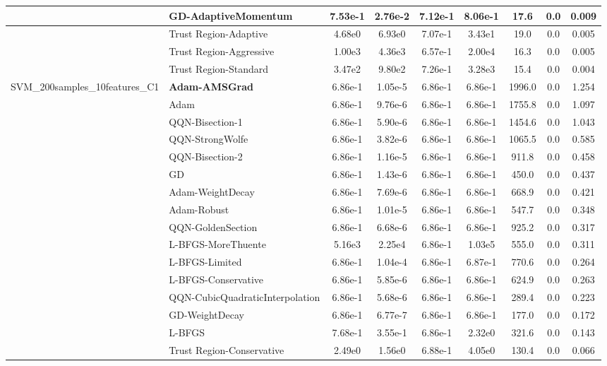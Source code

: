 \documentclass{article}
\begin{document}
\begin{longtable}{|l|l|c|c|c|c|c|c|c|}
\hline
 & GD-AdaptiveMomentum & 7.53e-1 & 2.76e-2 & 7.12e-1 & 8.06e-1 & 17.6 & 0.0 & 0.009 \\
\hline
 & Trust Region-Adaptive & 4.68e0 & 6.93e0 & 7.07e-1 & 3.43e1 & 19.0 & 0.0 & 0.005 \\
\hline
 & Trust Region-Aggressive & 1.00e3 & 4.36e3 & 6.57e-1 & 2.00e4 & 16.3 & 0.0 & 0.005 \\
\hline
 & Trust Region-Standard & 3.47e2 & 9.80e2 & 7.26e-1 & 3.28e3 & 15.4 & 0.0 & 0.004 \\
SVM\_200samples\_10features\_C1 & \textbf{Adam-AMSGrad} & 6.86e-1 & 1.05e-5 & 6.86e-1 & 6.86e-1 & 1996.0 & 0.0 & 1.254 \\
\hline
 & Adam & 6.86e-1 & 9.76e-6 & 6.86e-1 & 6.86e-1 & 1755.8 & 0.0 & 1.097 \\
\hline
 & QQN-Bisection-1 & 6.86e-1 & 5.90e-6 & 6.86e-1 & 6.86e-1 & 1454.6 & 0.0 & 1.043 \\
\hline
 & QQN-StrongWolfe & 6.86e-1 & 3.82e-6 & 6.86e-1 & 6.86e-1 & 1065.5 & 0.0 & 0.585 \\
\hline
 & QQN-Bisection-2 & 6.86e-1 & 1.16e-5 & 6.86e-1 & 6.86e-1 & 911.8 & 0.0 & 0.458 \\
\hline
 & GD & 6.86e-1 & 1.43e-6 & 6.86e-1 & 6.86e-1 & 450.0 & 0.0 & 0.437 \\
\hline
 & Adam-WeightDecay & 6.86e-1 & 7.69e-6 & 6.86e-1 & 6.86e-1 & 668.9 & 0.0 & 0.421 \\
\hline
 & Adam-Robust & 6.86e-1 & 1.01e-5 & 6.86e-1 & 6.86e-1 & 547.7 & 0.0 & 0.348 \\
\hline
 & QQN-GoldenSection & 6.86e-1 & 6.68e-6 & 6.86e-1 & 6.86e-1 & 925.2 & 0.0 & 0.317 \\
\hline
 & L-BFGS-MoreThuente & 5.16e3 & 2.25e4 & 6.86e-1 & 1.03e5 & 555.0 & 0.0 & 0.311 \\
\hline
 & L-BFGS-Limited & 6.86e-1 & 1.04e-4 & 6.86e-1 & 6.87e-1 & 770.6 & 0.0 & 0.264 \\
\hline
 & L-BFGS-Conservative & 6.86e-1 & 5.85e-6 & 6.86e-1 & 6.86e-1 & 624.9 & 0.0 & 0.263 \\
\hline
 & QQN-CubicQuadraticInterpolation & 6.86e-1 & 5.68e-6 & 6.86e-1 & 6.86e-1 & 289.4 & 0.0 & 0.223 \\
\hline
 & GD-WeightDecay & 6.86e-1 & 6.77e-7 & 6.86e-1 & 6.86e-1 & 177.0 & 0.0 & 0.172 \\
\hline
 & L-BFGS & 7.68e-1 & 3.55e-1 & 6.86e-1 & 2.32e0 & 321.6 & 0.0 & 0.143 \\
\hline
 & Trust Region-Conservative & 2.49e0 & 1.56e0 & 6.88e-1 & 4.05e0 & 130.4 & 0.0 & 0.066 \\

\end{longtable}
\end{document}

